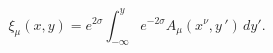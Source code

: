 \begin{equation}\label{gaugetrMuNu}
\xi_{\mu}(x,y)=e^{2\sigma}\int_{-\infty}^{y}e^{-2\sigma}
A_{\mu}\left(x^{\nu},y\,'\right)\,dy'.
\end{equation}

